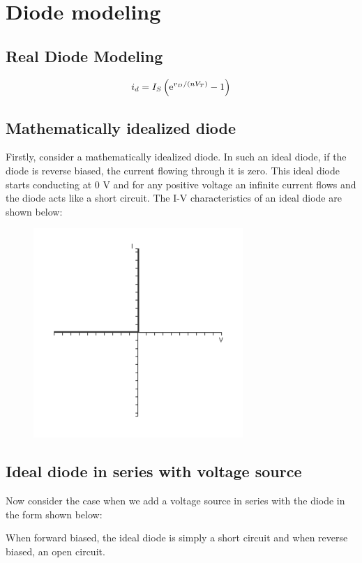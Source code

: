 \section{Diode modeling}

\subsection{Real Diode Modeling}

\begin{equation*}
  \begin{aligned}
    i_d = I_S \left( \mathrm{e}^{v_D / \left( n V_T \right)} - 1 \right)
  \end{aligned}
\end{equation*}

\subsection{Mathematically idealized diode}

Firstly, consider a mathematically idealized diode. In such an ideal diode, if the diode is reverse biased, the current flowing through it is zero. This ideal diode starts conducting at 0 V and for any positive voltage an infinite current flows and the diode acts like a short circuit. The I-V characteristics of an ideal diode are shown below:

\begin{figure}[H]
  \centering
  \includegraphics[width=0.4\linewidth]{figures/Diode_Modelling_Image5.png}
\end{figure}

\subsection{Ideal diode in series with voltage source}

Now consider the case when we add a voltage source in series with the diode in the form shown below:

When forward biased, the ideal diode is simply a short circuit and when reverse biased, an open circuit.

